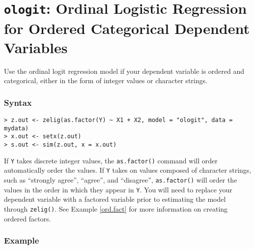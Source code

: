 




\section{{\tt ologit}: Ordinal Logistic Regression for Ordered
Categorical Dependent Variables}\label{ologit}

Use the ordinal logit regression model if your dependent variable is
ordered and categorical, either in the form of integer values or character strings.  

\subsubsection{Syntax}

\begin{verbatim}
> z.out <- zelig(as.factor(Y) ~ X1 + X2, model = "ologit", data = mydata)
> x.out <- setx(z.out)
> s.out <- sim(z.out, x = x.out)
\end{verbatim}
If {\tt Y} takes discrete integer values, the {\tt as.factor()}
command will order automatically order the values.  If {\tt Y} takes
on values composed of character strings, such as ``strongly agree'',
``agree'', and ``disagree'', {\tt as.factor()} will order the values
in the order in which they appear in {\tt Y}.  You will need to
replace your dependent variable with a factored variable prior to
estimating the model through {\tt zelig()}.  See Example
\ref{ord.fact} for more information on creating ordered factors.

\subsubsection{Example}

